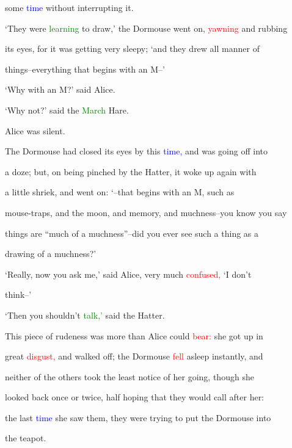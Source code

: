  some \textcolor{blue}{time} without \textcolor{BurntOrange}{interrupting} it.



 ‘They were \textcolor{green}{learning} to draw,’ the Dormouse went on, \textcolor{red}{yawning} and rubbing

 its eyes, for it was getting very sleepy; ‘and they drew all manner of

 things--everything that begins with an M--’



 ‘Why with an M?’ said Alice.



 ‘Why not?’ said the \textcolor{green}{March} Hare.



 Alice was silent.



 The Dormouse had closed its eyes by this \textcolor{blue}{time,} and was going off into

 a doze; but, on being pinched by the Hatter, it woke up again with

 a little \textcolor{BurntOrange}{shriek,} and went on: ‘--that begins with an M, such as

 mouse-traps, and the moon, and memory, and muchness--you know you say

 things are “much of a muchness”--did you ever see such a thing as a

 drawing of a muchness?’



 ‘Really, now you ask me,’ said Alice, very much \textcolor{red}{confused,} ‘I don’t

 think--’



 ‘Then you shouldn’t \textcolor{green}{talk,’} said the Hatter.



 This piece of rudeness was more than Alice could \textcolor{red}{bear:} she got up in

 great \textcolor{red}{disgust,} and walked off; the Dormouse \textcolor{red}{fell} asleep instantly, and

 neither of the others took the least notice of her going, though she

 looked back once or twice, half hoping that they would call after her:

 the last \textcolor{blue}{time} she saw them, they were trying to put the Dormouse into

 the teapot.



